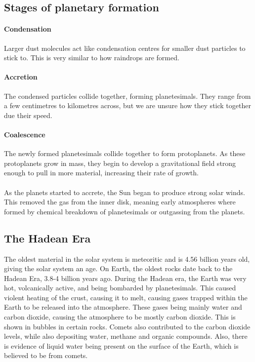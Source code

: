 \documentclass[12pt]{article}
\begin{document}
	\subsection{Stages of planetary formation}
	\paragraph{Condensation}
		Larger dust molecules act like condensation centres for smaller dust particles to stick to.
		This is very similar to how raindrops are formed.
	\paragraph{Accretion}
		The condensed particles collide together, forming planetesimals.
		They range from a few centimetres to kilometres across, but we are unsure how they stick together due their speed.
	\paragraph{Coalescence}
		The newly formed planetesimals collide together to form protoplanets.
		As these protoplanets grow in mass, they begin to develop a gravitational field strong enough to pull in more material, increasing their rate of growth.
	\\
	\\
	As the planets started to accrete, the Sun began to produce strong solar winds.
	This removed the gas from the inner disk, meaning early atmospheres where formed by chemical breakdown of planetesimals or outgassing from the planets.

	\subsection{The Hadean Era}
	The oldest material in the solar system is meteoritic and is 4.56 billion years old, giving the solar system an age.
	On Earth, the oldest rocks date back to the Hadean Era, 3.8-4 billion years ago.
	During the Hadean era, the Earth was very hot, volcanically active, and being bombarded by planetesimals.
	This caused violent heating of the crust, causing it to melt, causing gases trapped within the Earth to be released into the atmosphere.
	These gases being mainly water and carbon dioxide, causing the atmosphere to be mostly carbon dioxide.
	This is shown in bubbles in certain rocks.
	Comets also contributed to the carbon dioxide levels, while also depositing water, methane and organic compounds.
	Also, there is evidence of liquid water being present on the surface of the Earth, which is believed to be from comets.
\end{document}
